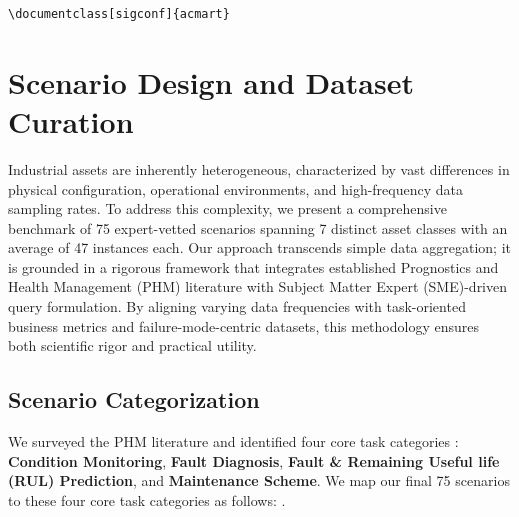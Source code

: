 \documentclass[sigconf]{acmart}
\begin{document}

\begin{verbatim}
\documentclass[sigconf]{acmart}
\end{verbatim}

\section{Scenario Design and Dataset Curation}

Industrial assets are inherently heterogeneous, characterized by vast differences in physical configuration, operational environments, and high-frequency data sampling rates. To address this complexity, we present a comprehensive benchmark of 75 expert-vetted scenarios spanning 7 distinct asset classes with an average of 47 instances each. Our approach transcends simple data aggregation; it is grounded in a rigorous framework that integrates established Prognostics and Health Management (PHM) literature with Subject Matter Expert (SME)-driven query formulation. By aligning varying data frequencies with task-oriented business metrics and failure-mode-centric datasets, this methodology ensures both scientific rigor and practical utility.

\subsection{Scenario Categorization} We surveyed the PHM literature \cite{} and identified four core task categories : \textbf{Condition Monitoring}, \textbf{Fault Diagnosis}, \textbf{Fault \& Remaining Useful life (RUL) Prediction}, and \textbf{Maintenance Scheme}. We map our final 75 scenarios to these four core task categories as follows: .
\end{document}
